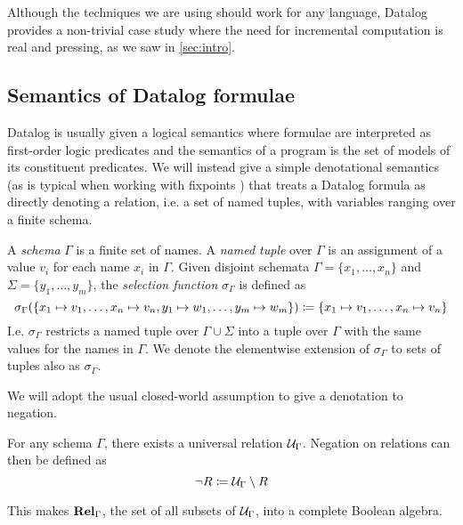 Although the techniques we are using should work for any language, Datalog
provides a non-trivial case study where the need for incremental computation is
real and pressing, as we saw in \cref{sec:intro}.

\subsection{Semantics of Datalog formulae}

Datalog is usually given a logical semantics where formulae are interpreted as first-order
logic predicates and the semantics of a program is the set of models of its constituent
predicates. We will instead give a simple denotational semantics (as is
typical when working with fixpoints \autocite[See e.g.][]{compton1994stratified}) that treats a Datalog
formula as directly denoting a relation, i.e.
a set of named tuples, with variables ranging over a finite schema.

\begin{defn}
  A \emph{schema} $\Gamma$ is a finite set of names. A \emph{named tuple} over $\Gamma$ is an assignment
  of a value $v_i$ for each name $x_i$ in $\Gamma$. Given disjoint schemata 
  $\Gamma = \{ x_1, \ldots, x_n \}$ and $\Sigma = \{ y_1, \ldots, y_m \}$,
  the \emph{selection function} $\sigma_\Gamma$ is defined as
  \begin{displaymath}
    \sigma_\Gamma(\{x_1 \mapsto v_1, \ldots, x_n \mapsto v_n, y_1 \mapsto w_1, \ldots, y_m \mapsto w_m \})
    \coloneqq \{ x_1 \mapsto v_1, \ldots, x_n \mapsto v_n \}
  \end{displaymath}
  I.e. $\sigma_\Gamma$ restricts a named tuple over $\Gamma \cup \Sigma$ into a tuple over $\Gamma$
  with the same values for the names in $\Gamma$.
  We denote the elementwise extension of $\sigma_\Gamma$ to sets of tuples also as $\sigma_\Gamma$.
\end{defn}

We will adopt the usual closed-world assumption to give a denotation to negation.

\begin{defn}
  For any schema $\Gamma$,
  there exists a universal relation $\mathcal{U}_\Gamma$.
  Negation on relations can then be defined as
  \begin{displaymath}
    \neg R \coloneqq \mathcal{U}_\Gamma \setminus R
  \end{displaymath}
\end{defn}

This makes $\mathbf{Rel}_\Gamma$, the set of all subsets of $\mathcal{U}_\Gamma$,
into a complete Boolean algebra.

